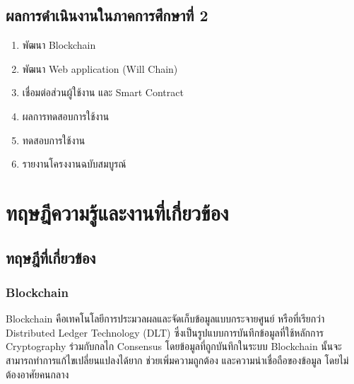 \documentclass[12pt,oneside,openright,a4paper]{cpe-thai-project}
\begin{document}
\section{ผลการดำเนินงานในภาคการศึกษาที่ 2}
\begin{enumerate}
\item พัฒนา Blockchain
\item พัฒนา Web application (Will Chain)
\item เชื่อมต่อส่วนผู้ใช้งาน และ Smart Contract
\item ผลการทดสอบการใช้งาน
\item ทดสอบการใช้งาน
\item รายงานโครงงานฉบับสมบูรณ์
\end{enumerate}

\chapter{ทฤษฎีความรู้และงานที่เกี่ยวข้อง}

\section{ทฤษฎีที่เกี่ยวข้อง}
\subsection{Blockchain}
\tab Blockchain คือเทคโนโลยีการประมวลผลและจัดเก็บข้อมูลแบบกระจายศูนย์ หรือที่เรียกว่า Distributed Ledger Technology (DLT) ซึ่งเป็นรูปแบบการบันทึกข้อมูลที่ใช้หลักการ Cryptography ร่วมกับกลไก Consensus โดยข้อมูลที่ถูกบันทึกในระบบ Blockchain นั้นจะสามารถทำการแก้ไขเปลี่ยนแปลงได้ยาก ช่วยเพิ่มความถูกต้อง และความน่าเชื่อถือของข้อมูล โดยไม่ต้องอาศัยคนกลาง
\end{document}
